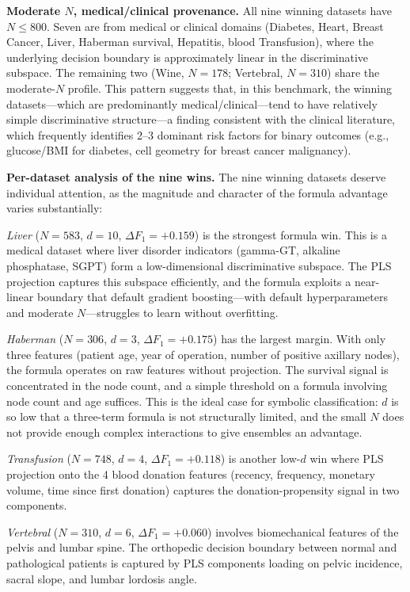 \documentclass[journal]{IEEEtran}
\begin{document}
\textbf{Moderate $N$, medical/clinical provenance.}
All nine winning datasets have $N \leq 800$.  Seven are from
medical or clinical domains (Diabetes, Heart, Breast Cancer, Liver,
Haberman survival, Hepatitis, blood Transfusion), where the
underlying decision boundary is approximately linear in the
discriminative subspace.  The remaining two (Wine, $N = 178$;
Vertebral, $N = 310$) share the moderate-$N$ profile.  This pattern
suggests that, in this benchmark, the winning datasets---which are predominantly medical/clinical---tend to have relatively simple
discriminative structure---a finding consistent with the clinical
literature, which frequently identifies 2--3 dominant risk factors
for binary outcomes (e.g., glucose/BMI for diabetes, cell geometry
for breast cancer malignancy).

\textbf{Per-dataset analysis of the nine wins.}
The nine winning datasets deserve individual attention, as the
magnitude and character of the formula advantage varies
substantially:

\emph{Liver} ($N = 583$, $d = 10$, $\Delta F_1 = +0.159$) is the
strongest formula win.  This is a medical dataset where liver
disorder indicators (gamma-GT, alkaline phosphatase, SGPT) form a
low-dimensional discriminative subspace.  The PLS projection
captures this subspace efficiently, and the formula exploits a
near-linear boundary that default gradient boosting---with default
hyperparameters and moderate $N$---struggles to learn without
overfitting.

\emph{Haberman} ($N = 306$, $d = 3$, $\Delta F_1 = +0.175$) has the
largest margin.  With only three features (patient age, year of
operation, number of positive axillary nodes), the formula operates
on raw features without projection.  The survival signal is
concentrated in the node count, and a simple threshold on a
formula involving node count and age suffices.  This is the ideal
case for symbolic classification: $d$ is so low that a three-term
formula is not structurally limited, and the small $N$ does not
provide enough complex interactions to give ensembles an advantage.

\emph{Transfusion} ($N = 748$, $d = 4$, $\Delta F_1 = +0.118$) is
another low-$d$ win where PLS projection onto the 4 blood donation
features (recency, frequency, monetary volume, time since first
donation) captures the donation-propensity signal in two components.

\emph{Vertebral} ($N = 310$, $d = 6$, $\Delta F_1 = +0.060$)
involves biomechanical features of the pelvis and lumbar spine.  The
orthopedic decision boundary between normal and pathological
patients is captured by PLS components loading on pelvic incidence,
sacral slope, and lumbar lordosis angle.
\end{document}
